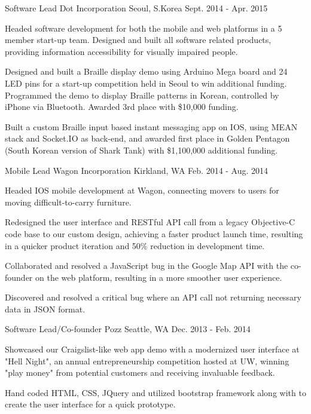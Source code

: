 \begin{cventries}
\cventry
{Software Lead} %
{Dot Incorporation} %
{Seoul, S.Korea} %
{Sept. 2014 - Apr. 2015} %
{ %
\begin{cvitems}
\item {Headed software development for both the mobile and web platforms in a 5 member start-up team.  Designed and built all software related products, providing information accessibility for visually impaired people.}
\item {Designed and built a Braille display demo using Arduino Mega board and 24 LED pins for a start-up competition held in Seoul to win additional funding. Programmed the demo to display Braille patterns in Korean, controlled by iPhone via Bluetooth.  Awarded 3rd place with \$10,000 funding.}
\item {Built a custom Braille input based instant messaging app on IOS, using MEAN stack and Socket.IO as back-end, and awarded first place in Golden Pentagon (South Korean version of Shark Tank) with \$1,100,000 additional funding.}
\end{cvitems}
}


\cventry
{Mobile Lead} %
{Wagon Incorporation} %
{Kirkland, WA} %
{Feb. 2014 - Aug. 2014} %
{ %
\begin{cvitems}
\item {Headed IOS mobile development at Wagon, connecting movers to users for moving difficult-to-carry furniture.}
\item {Redesigned the user interface and RESTful API call from a legacy Objective-C code base to our custom design, achieving a faster product launch time, resulting in a quicker product iteration and 50\% reduction in development time.}
\item {Collaborated and resolved a JavaScript bug in the Google Map API with the co-founder on the web platform, resulting in a more smoother user experience.}
\item {Discovered and resolved a critical bug where an API call not returning necessary data in JSON format.} 
\end{cvitems}
}



\cventry
{Software Lead/Co-founder} %
{Pozz} %
{Seattle, WA} %
{Dec. 2013 - Feb. 2014} %
{ %
\begin{cvitems}
\item {Showcased our Craigslist-like web app demo with a modernized user interface at "Hell Night", an annual entrepreneurship competition hosted at UW, winning "play money" from potential customers and receiving invaluable feedback.}
\item {Hand coded HTML, CSS, JQuery and utilized bootstrap framework along with to create the user interface for a quick prototype.}
\end{cvitems} 
}



\end{cventries}
